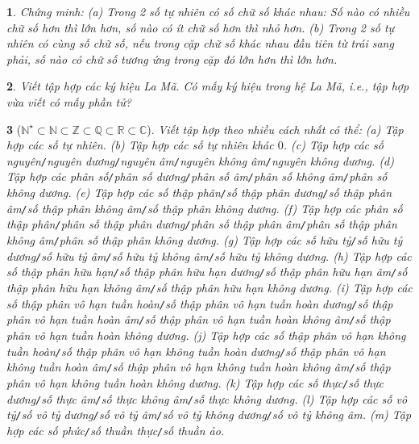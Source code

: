 \documentclass{article}
\newtheorem{baitoan}{}
\begin{document}
\begin{baitoan}
	Chứng minh: (a) Trong 2 số tự nhiên có số chữ số khác nhau: Số nào có nhiều chữ số hơn thì lớn hơn, số nào có ít chữ số hơn thì nhỏ hơn. (b) Trong 2 số tự nhiên có cùng số chữ số, nếu trong cặp chữ số khác nhau đầu tiên từ trái sang phải, số nào có chữ số tương ứng trong cặp đó lớn hơn thì lớn hơn.
\end{baitoan}

\begin{baitoan}
	Viết tập hợp các ký hiệu La Mã. Có mấy ký hiệu trong hệ La Mã, i.e., tập hợp vừa viết có mấy phần tử?
\end{baitoan}

\begin{baitoan}[$\mathbb{N}^\star\subset\mathbb{N}\subset\mathbb{Z}\subset\mathbb{Q}\subset\mathbb{R}\subset\mathbb{C}$]
	Viết tập hợp theo nhiều cách nhất có thể: (a) Tập hợp các số tự nhiên. (b) Tập hợp các số tự nhiên khác $0$. (c) Tập hợp các số nguyên{\tt/}nguyên dương{\tt/}nguyên âm{\tt/}nguyên không âm{\tt/}nguyên không dương. (d) Tập hợp các phân số{\tt/}phân số dương{\tt/}phân số âm{\tt/}phân số không âm{\tt/}phân số không dương. (e) Tập hợp các số thập phân{\tt/}số thập phân dương{\tt/}số thập phân âm{\tt/}số thập phân không âm{\tt/}số thập phân không dương. (f) Tập hợp các phân số thập phân{\tt/}phân số thập phân dương{\tt/}phân số thập phân âm{\tt/}phân số thập phân không âm{\tt/}phân số thập phân không dương. (g) Tập hợp các số hữu tỷ{\tt/}số hữu tỷ dương{\tt/}số hữu tỷ âm{\tt/}số hữu tỷ không âm{\tt/}số hữu tỷ không dương. (h) Tập hợp các số thập phân hữu hạn{\tt/}số thập phân hữu hạn dương{\tt/}số thập phân hữu hạn âm{\tt/}số thập phân hữu hạn không âm{\tt/}số thập phân hữu hạn không dương. (i) Tập hợp các số thập phân vô hạn tuần hoàn{\tt/}số thập phân vô hạn tuần hoàn dương{\tt/}số thập phân vô hạn tuần hoàn âm{\tt/}số thập phân vô hạn tuần hoàn không âm{\tt/}số thập phân vô hạn tuần hoàn không dương. (j) Tập hợp các số thập phân vô hạn không tuần hoàn{\tt/}số thập phân vô hạn không tuần hoàn dương{\tt/}số thập phân vô hạn không tuần hoàn âm{\tt/}số thập phân vô hạn không tuần hoàn không âm{\tt/}số thập phân vô hạn không tuần hoàn không dương.  (k) Tập hợp các số thực{\tt/}số thực dương{\tt/}số thực âm{\tt/}số thực không âm{\tt/}số thực không dương. (l) Tập hợp các số vô tỷ{\tt/}số vô tỷ dương{\tt/}số vô tỷ âm{\tt/}số vô tỷ không dương{\tt/}số vô tỷ không âm. (m) Tập hợp các số phức{\tt/}số thuần thực{\tt/}số thuần ảo.
\end{baitoan}


\printbibliography[heading=bibintoc]
\end{document}
